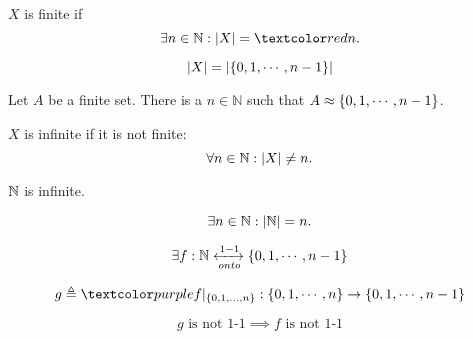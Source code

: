 \begin{frame}{}
  \begin{definition}[Finite]
    $X$ is finite if
    \[
      \exists n \in \N: |X| = \red{n}.
    \]
  \end{definition}

  \pause
  \[
    |X| = |\{0, 1, \cdots, n-1\}|
  \]

  \pause
  \begin{theorem}[UD Theorem 22.6]
    Let $A$ be a finite set. 
    There is a  $n \in \mathbb{N}$ such that $A \approx \{0, 1, \cdots, n-1\}$.
  \end{theorem}

\end{frame}

\begin{frame}{}
  \begin{definition}[Infinite]
    $X$ is infinite if it is not finite:
    \[
      \forall n \in \mathbb{N}: |X| \neq n.
    \]
  \end{definition}

  \pause
  \begin{theorem}[UD Theorem 22.3]
    $\mathbb{N}$ is infinite. 
  \end{theorem}

  \pause
  \begin{center}

    \pause
    \vspace{-0.30cm}
    \[
      \exists n \in \mathbb{N}: |\mathbb{N}| = n.
    \]

    \pause
    \vspace{-0.30cm}
    \[
      \exists f: \mathbb{N} \xleftrightarrow[onto]{1-1} \{0, 1, \cdots, n-1\}
    \]

    \pause
    \vspace{-0.30cm}
    \[
      g \triangleq \purple{f|_{\set{0, 1, \ldots, n}}}: \set{0, 1, \cdots, n} \to \set{0, 1, \cdots, n-1}
    \]

    \pause
    \vspace{-0.30cm}
    \[
      g \text{ is not 1-1} \implies f \text{ is not 1-1}
    \]
  \end{center}
\end{frame}

